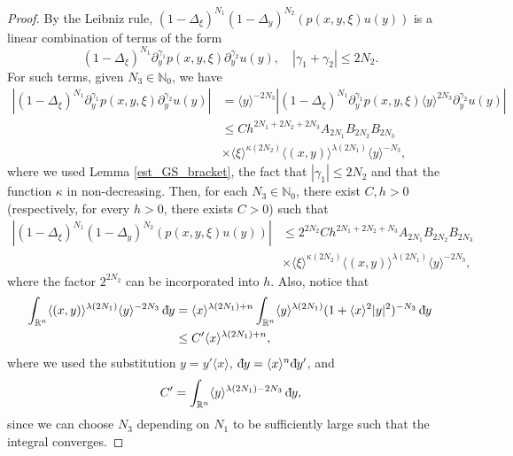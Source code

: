 \documentclass[11pt,reqno]{amsart}
\numberwithin{equation}{section}
\newcommand{\dbar}{\mathrm{d}\hspace*{-0.15em}\bar{}\hspace*{0.1em}}
\begin{document}
\begin{proof}
	By the Leibniz rule, $(1-\Delta_\xi)^{N_1}(1-\Delta_y)^{N_2}(p(x,y,\xi)u(y))$ is a linear combination of terms of the form
	\[(1-\Delta_\xi)^{N_1}\partial_y^{\gamma_1}p(x,y,\xi)\partial_y^{\gamma_2}u(y),\quad |\gamma_1+\gamma_2|\leq 2N_2.\]
	For such terms, given $N_3\in\mathbb{N}_0$, we have
	\begin{align*}
		|(1-\Delta_\xi)^{N_1}\partial_y^{\gamma_1}p(x,y,\xi)\partial_y^{\gamma_2}u(y)| & = \langle y\rangle^{-2N_3}|(1-\Delta_\xi)^{N_1}\partial_y^{\gamma_1}p(x,y,\xi)\langle y\rangle^{2N_3}\partial_y^{\gamma_2}u(y)|\\
		& \leq Ch^{2N_1+2N_2+2N_3} A_{2N_1}B_{2N_2} B_{2N_3}\\
		& \times \langle\xi\rangle^{\kappa(2N_2)}\langle (x,y)\rangle^{\lambda(2N_1)}\langle y\rangle^{-N_3},
	\end{align*}
	where we used Lemma \ref{est_GS_bracket}, the fact that $|\gamma_1|\leq 2N_2$ and that the function $\kappa$ in non-decreasing. Then, for each $N_3\in\mathbb{N}_0$, there exist $C,h>0$ (respectively, for every $h>0$, there exists $C>0$) such that
	\begin{align*}|(1-\Delta_\xi)^{N_1}(1-\Delta_y)^{N_2}(p(x,y,\xi)u(y))| & \leq 2^{2N_2}Ch^{2N_1+2N_2+N_3} A_{2N_1}B_{2N_2} B_{2N_3}\\
		& \times \langle\xi\rangle^{\kappa(2N_2)}\langle (x,y)\rangle^{\lambda(2N_1)}\langle y\rangle^{-2N_3},
	\end{align*}
	where the factor $2^{2N_2}$ can be incorporated into $h$. Also, notice that
	\begin{align*}
		\int_{\mathbb{R}^n}\langle (x,y)\rangle^{\lambda(2N_1)}\langle y\rangle^{-2N_3}\,\dbar y & = \langle x\rangle^{\lambda(2N_1)+n}\int_{\mathbb{R}^n}\langle y\rangle^{\lambda(2N_1)}(1+\langle x\rangle^2|y|^2)^{-N_3}\,\dbar y\\
		& \leq C'\langle x\rangle^{\lambda(2N_1)+n},
	\end{align*}
	where we used the substitution $y=y'\langle x\rangle$, $\dbar y = \langle x\rangle^n\dbar y'$, and %
	\[C'=\int_{\mathbb{R}^n}\langle y\rangle^{\lambda(2N_1)-2N_3}\,\dbar y,\]
	since we can choose $N_3$ depending on $N_1$ to be sufficiently large such that the integral converges.
	

\end{proof}
\end{document}
